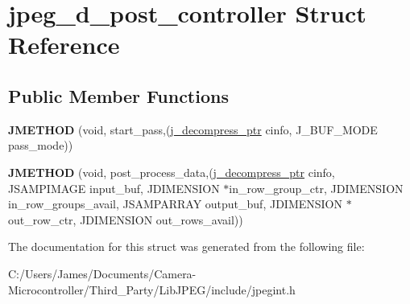 \hypertarget{structjpeg__d__post__controller}{}\section{jpeg\+\_\+d\+\_\+post\+\_\+controller Struct Reference}
\label{structjpeg__d__post__controller}
\subsection*{Public Member Functions}
\begin{DoxyCompactItemize}
\item 
\mbox{\label{structjpeg__d__post__controller_ace9537865f660119b682154abb6b8f48}} 
{\bfseries J\+M\+E\+T\+H\+OD} (void, start\+\_\+pass,(\hyperlink{structjpeg__decompress__struct}{j\+\_\+decompress\+\_\+ptr} cinfo, J\+\_\+\+B\+U\+F\+\_\+\+M\+O\+DE pass\+\_\+mode))
\item 
\mbox{\label{structjpeg__d__post__controller_afce74036d0bb81f55b23f6b3f99b65b0}} 
{\bfseries J\+M\+E\+T\+H\+OD} (void, post\+\_\+process\+\_\+data,(\hyperlink{structjpeg__decompress__struct}{j\+\_\+decompress\+\_\+ptr} cinfo, J\+S\+A\+M\+P\+I\+M\+A\+GE input\+\_\+buf, J\+D\+I\+M\+E\+N\+S\+I\+ON $\ast$in\+\_\+row\+\_\+group\+\_\+ctr, J\+D\+I\+M\+E\+N\+S\+I\+ON in\+\_\+row\+\_\+groups\+\_\+avail, J\+S\+A\+M\+P\+A\+R\+R\+AY output\+\_\+buf, J\+D\+I\+M\+E\+N\+S\+I\+ON $\ast$out\+\_\+row\+\_\+ctr, J\+D\+I\+M\+E\+N\+S\+I\+ON out\+\_\+rows\+\_\+avail))
\end{DoxyCompactItemize}


The documentation for this struct was generated from the following file\+:\begin{DoxyCompactItemize}
\item 
C\+:/\+Users/\+James/\+Documents/\+Camera-\/\+Microcontroller/\+Third\+\_\+\+Party/\+Lib\+J\+P\+E\+G/include/jpegint.\+h\end{DoxyCompactItemize}

